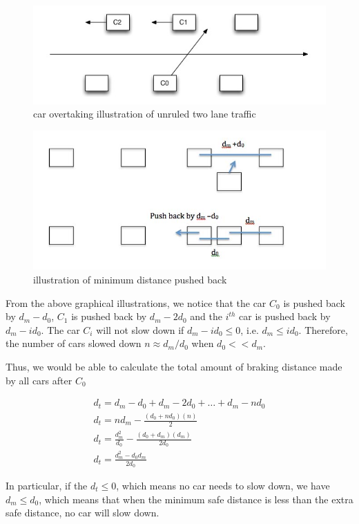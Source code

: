 \begin{figure}
\includegraphics[scale = 0.5]{plot/P1}
\caption{car overtaking illustration of unruled two lane traffic}
\end{figure}

\begin{figure}
\includegraphics[scale = 0.5]{plot/P2}
\caption{illustration of minimum distance pushed back}
\end{figure}

From the above graphical illustrations, we notice that the car $C_0$ is pushed back by $d_m-d_0$, $C_1$ is pushed back by $d_m-2d_0$ and the $i^{th}$ car is pushed back by $d_m-id_0$. The car $C_i$ will not slow down if $d_m-id_0\le 0$, i.e. $d_m \le id_0$. Therefore, the number of cars slowed down $n \approx d_m/d_0$ when $d_0 << d_m$. 

Thus, we would be able to calculate the total amount of braking distance made by all cars after $C_0$

\begin{align}
&d_t = d_m-d_0 + d_m-2d_0 + \dots + d_m - nd_0 & \\
&d_t = nd_m-\frac{(d_0+nd_0)(n)}{2}&\\
&d_t = \frac{d_m^2}{d_0}-\frac{(d_0+d_m)(d_m)}{2d_0}&\\
&d_t = \frac{d_m^2-d_0d_m}{2d_0}
\end{align}

In particular, if the $d_t \le 0$, which means no car needs to slow down, we have $d_m\le d_0$, which means that when the minimum safe distance is less than the extra safe distance, no car will slow down. 

